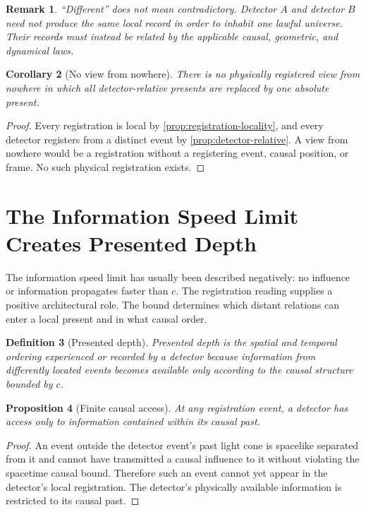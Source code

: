 \documentclass[12pt,onecolumn]{article}
\newtheorem{proposition}{Proposition}[section]
\newtheorem{definition}[proposition]{Definition}
\newtheorem{corollary}[proposition]{Corollary}
\newtheorem{remark}[proposition]{Remark}
\begin{document}
\begin{remark}
``Different'' does not mean contradictory. Detector \(A\) and detector \(B\) need not produce the same local record in order to inhabit one lawful universe. Their records must instead be related by the applicable causal, geometric, and dynamical laws.
\end{remark}

\begin{corollary}[No view from nowhere]
\label{cor:no-nowhere}
There is no physically registered view from nowhere in which all detector-relative presents are replaced by one absolute present.
\end{corollary}

\begin{proof}
Every registration is local by \cref{prop:registration-locality}, and every detector registers from a distinct event by \cref{prop:detector-relative}. A view from nowhere would be a registration without a registering event, causal position, or frame. No such physical registration exists.
\end{proof}

\section{The Information Speed Limit Creates Presented Depth}

The information speed limit has usually been described negatively: no influence or information propagates faster than \(c\). The registration reading supplies a positive architectural role. The bound determines which distant relations can enter a local present and in what causal order.

\begin{definition}[Presented depth]
\label{def:presented-depth}
Presented depth is the spatial and temporal ordering experienced or recorded by a detector because information from differently located events becomes available only according to the causal structure bounded by \(c\).
\end{definition}

\begin{proposition}[Finite causal access]
\label{prop:finite-access}
At any registration event, a detector has access only to information contained within its causal past.
\end{proposition}

\begin{proof}
An event outside the detector event's past light cone is spacelike separated from it and cannot have transmitted a causal influence to it without violating the spacetime causal bound. Therefore such an event cannot yet appear in the detector's local registration. The detector's physically available information is restricted to its causal past.
\end{proof}
\end{document}
